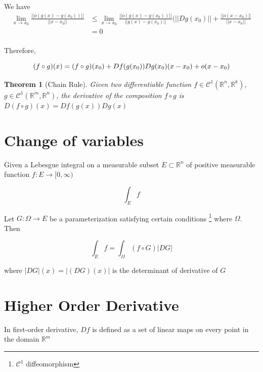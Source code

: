 \documentclass{article}
\newtheorem{theorem}{Theorem}
\begin{document}
We have
\begin{align*}
    \lim_{x \to x_0} \frac{||o(g(x) - g(x_0))||}{||x - x_0||}  &\leq \lim_{x \to x_0} \frac{||o(g(x) - g(x_0))||}{||g(x)- g(x_0)||} ( ||Dg(x_0)|| + \frac{||o(x - x_0)||}{||x - x_0||} \\
                                                                    &= 0 \\
\end{align*}

Therefore,

\begin{equation}
    (f \circ g)(x) = (f \circ g)(x_0) + Df(g(x_0)) Dg(x_0)(x - x_0) + o(x - x_0) \\
\end{equation}

\begin{theorem} [Chain Rule]
Given two differentiable function $f \in \mathcal{C}^1(\mathbb{R}^n, \mathbb{R}^k)$, $g \in \mathcal{C}^1(\mathbb{R}^m, \mathbb{R}^n)$, the derivative of the composition $f \circ g$ is $D(f \circ g)(x) = Df(g(x)) Dg(x)$
\end{theorem}

\section{Change of variables}

Given a Lebesgue integral on a measurable subset $E \subset \mathbb{R}^n$ of positive measurable function $f: E \to [0, \infty)$ 

\begin{equation}
    \int_{E} f
\end{equation}

Let $G: \Omega \to E$ be a parameterization satisfying certain conditions \footnote{$\mathcal{C}^1$ diffeomorphism} where $\Omega$. Then

\begin{equation}
    \int_{E} f = \int_{\Omega} (f \circ G) |DG|
\end{equation}

where $|DG|(x) = |(DG)(x)|$ is the determinant of derivative of $G$

\section{Higher Order Derivative}

In first-order derivative, $Df$ is defined as a set of linear maps on every point in the domain $\mathbb{R}^m$
\end{document}
